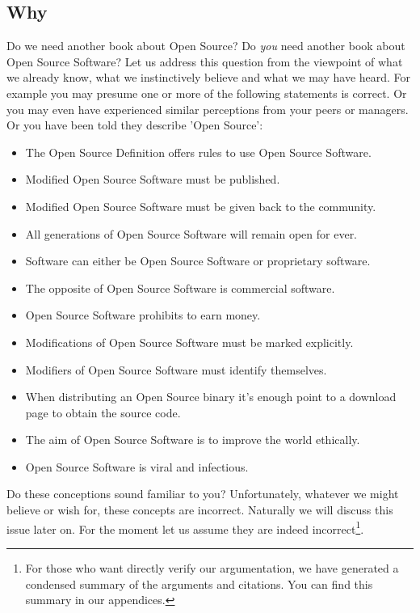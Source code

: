 
\subsection{Why}

Do we need another book about Open Source? Do \emph{you} need another book about
Open Source Software? Let us address this question from the viewpoint of what we
already know, what we instinctively believe and what we may have heard. For
example you may presume one or more of the following statements is correct. Or
you may even have experienced similar perceptions from your peers or managers.
Or you have been told they describe 'Open Source':

\begin{itemize}
  \item The Open Source Definition offers rules to use Open Source Software.
  \item Modified Open Source Software must be published.
  \item Modified Open Source Software must be given back to the community.
  \item All generations of Open Source Software will remain open for ever.
  \item Software can either be Open Source Software or proprietary software.
  \item The opposite of Open Source Software is commercial software.
  \item Open Source Software prohibits to earn money.
  \item Modifications of Open Source Software must be marked explicitly.
  \item Modifiers of Open Source Software must identify themselves.
  \item When distributing an Open Source binary it’s enough point to a download
  page to obtain the source code.
  \item The aim of Open Source Software is to improve the world ethically.
  \item Open Source Software is viral and infectious.
\end{itemize}

Do these conceptions sound familiar to you? Unfortunately, whatever we might
believe or wish for, these concepts are incorrect. Naturally we will discuss
this issue later on. For the moment let us assume they are indeed
incorrect\footnote{For those who want directly verify our argumentation, we have
generated a condensed summary of the arguments and citations. You can find this
summary in our appendices.}.

